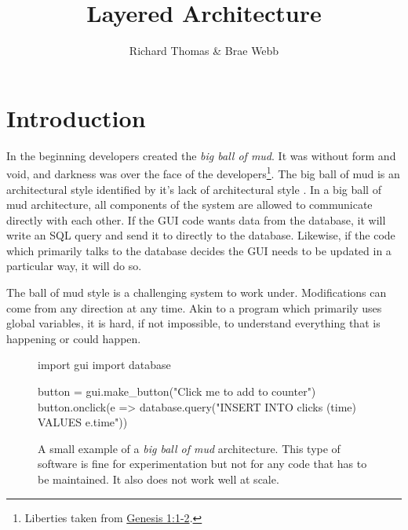 \title{Layered Architecture}
\author{Richard Thomas \& Brae Webb}
\date{}

\maketitle

\section{Introduction}
In the beginning developers created the \textit{big ball of mud}.
It was without form and void, and darkness was over the face of the developers\footnote{Liberties taken from
\href{https://www.biblegateway.com/passage/?search=gen+1\&version=ESV}{Genesis 1:1-2}.}.
The big ball of mud is an architectural style identified by it's lack of architectural style \cite{ballofmud}.
In a big ball of mud architecture, all components of the system are allowed to communicate directly with each other.
If the GUI code wants data from the database, it will write an SQL query and send it to directly to the database.
Likewise, if the code which primarily talks to the database decides the GUI needs to be updated in a particular way, it will do so.

The ball of mud style is a challenging system to work under.
Modifications can come from any direction at any time.
Akin to a program which primarily uses global variables,
it is hard, if not impossible,
to understand everything that is happening or could happen.


\begin{figure}[ht]
\begin{code}[style=python]{}
import gui
import database

button = gui.make_button("Click me to add to counter")
button.onclick(e => 
    database.query("INSERT INTO clicks (time) VALUES {{e.time}}"))
\end{code}
\vspace{-3mm}
\caption{
A small example of a \textit{big ball of mud} architecture.
This type of software is fine for experimentation
but not for any code that has to be maintained.
It also does not work well at scale.
}
\end{figure}

